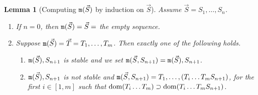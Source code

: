 \documentclass{lmcs}
\newtheorem{lemma}[theorem]{Lemma}
\begin{document}
\begin{lemma}[Computing ${\tt m}(\vec{S})$ by induction on $\vec{S}$]
\label{lemma-minstable.inductive}
Assume $\vec{S} = S_1, \ldots, S_n$. 
\begin{enumerate}
\item
If $n=0$, then ${\tt m}(\vec{S}) = \vec{S} = $ the empty sequence.
\item
Suppose ${\tt m}(\vec{S}) = \vec{T} = T_1, \ldots, T_m$. Then exactly
one of the following holds.
\begin{enumerate}
\item
${\tt m}(\vec{S}), S_{n+1}$ is stable and we set
${\tt m}(\vec{S}, S_{n+1}) = {\tt m}(\vec{S}), S_{n+1}$.
\item
${\tt m}(\vec{S}), S_{n+1}$ is \emph{not} stable and
${\tt m}(\vec{S}, S_{n+1}) = T_1, \ldots, (T_i \ldots T_m S_{n+1})$, 
for the first $i \in [1,m]$ such that 
${\rm dom}(T_i \ldots T_m) \supset {\rm dom}(T_i \ldots T_m S_{n+1})$.
\end{enumerate}
\end{enumerate}
\end{lemma}
\end{document}
